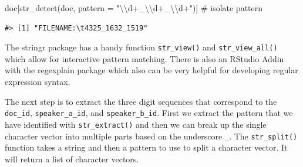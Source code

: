 \documentclass[
  letterpaper,
]{latex/krantz}
\newenvironment{Shaded}{\begin{snugshade}}{\end{snugshade}}
\newcommand{\AttributeTok}[1]{\textcolor[rgb]{0.40,0.45,0.13}{#1}}
\newcommand{\CommentTok}[1]{\textcolor[rgb]{0.37,0.37,0.37}{#1}}
\newcommand{\FunctionTok}[1]{\textcolor[rgb]{0.28,0.35,0.67}{#1}}
\newcommand{\NormalTok}[1]{\textcolor[rgb]{0.00,0.23,0.31}{#1}}
\newcommand{\SpecialCharTok}[1]{\textcolor[rgb]{0.37,0.37,0.37}{#1}}
\newcommand{\StringTok}[1]{\textcolor[rgb]{0.13,0.47,0.30}{#1}}
\begin{document}
\begin{Shaded}
\begin{Highlighting}[]
\NormalTok{doc[}\FunctionTok{str\_detect}\NormalTok{(doc, }\AttributeTok{pattern =} \StringTok{"}\SpecialCharTok{\textbackslash{}\textbackslash{}}\StringTok{d+\_}\SpecialCharTok{\textbackslash{}\textbackslash{}}\StringTok{d+\_}\SpecialCharTok{\textbackslash{}\textbackslash{}}\StringTok{d+"}\NormalTok{)] }\CommentTok{\# isolate pattern}
\end{Highlighting}
\end{Shaded}

\begin{verbatim}
#> [1] "FILENAME:\t4325_1632_1519"
\end{verbatim}

\begin{tcolorbox}[enhanced jigsaw, toprule=.15mm, bottomtitle=1mm, coltitle=black, title=\textcolor{quarto-callout-warning-color}{\faExclamationTriangle}\hspace{0.5em}{Tip}, left=2mm, colframe=quarto-callout-warning-color-frame, bottomrule=.15mm, colbacktitle=quarto-callout-warning-color!10!white, leftrule=.75mm, colback=white, titlerule=0mm, breakable, toptitle=1mm, opacityback=0, arc=.35mm, rightrule=.15mm, opacitybacktitle=0.6]

The stringr package has a handy function \texttt{str\_view()} and
\texttt{str\_view\_all()} which allow for interactive pattern matching.
There is also an RStudio Addin with the regexplain package which also
can be very helpful for developing regular expression syntax.

\end{tcolorbox}

The next step is to extract the three digit sequences that correspond to
the \texttt{doc\_id}, \texttt{speaker\_a\_id}, and
\texttt{speaker\_b\_id}. First we extract the pattern that we have
identified with \texttt{str\_extract()} and then we can break up the
single character vector into multiple parts based on the underscore
\texttt{\_}. The \texttt{str\_split()} function takes a string and then
a pattern to use to split a character vector. It will return a list of
character vectors.
\end{document}
